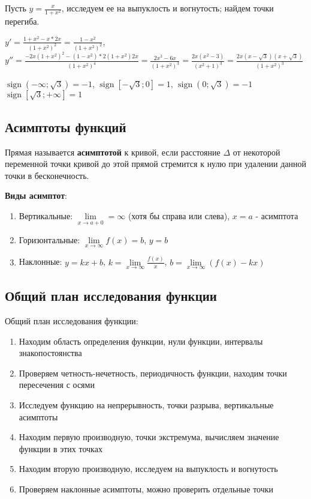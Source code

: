 \documentclass{article}
\DeclareMathOperator{\sign}{sign}
\begin{document}
\begin{flushleft}
Пусть $y = \frac{x}{1 + x^2}$, исследуем ее на выпуклость и вогнутость; найдем точки перегиба.

$y' = \frac{1 + x^2 - x * 2x}{(1 + x^2)^2} = \frac{1 - x^2}{(1 + x^2)^2}$, $y'' = \frac{-2x(1 + x^2)^2 - (1 - x^2) * 2 (1 + x^2) 2x}{(1 + x^2)^4} = \frac{2x^3 - 6x}{(1 + x^2)^3} = \frac{2x (x^2 - 3)}{(x^2 + 1)^3} = \frac{2x(x - \sqrt{3})(x + \sqrt{3})}{(1 + x^2)^3}$

$\sign (-\infty; \sqrt{3}) = -1$, $\sign [-\sqrt{3}; 0] = 1$, $\sign (0; \sqrt{3}) = -1$ $\sign [\sqrt{3}; +\infty] = 1$

\subsection{Асимптоты функций}

Прямая называется \textbf{асимптотой} к кривой, если расстояние $\Delta$ от некоторой переменной точки кривой до этой прямой стремится к нулю при удалении данной точки в бесконечность.

\textbf{Виды асимптот}:

\begin{enumerate}
    \item Вертикальные: $\lim\limits_{x \to a + 0} = \infty$ (хотя бы справа или слева), $x = a$ - асимптота
    \item Горизонтальные: $\lim\limits_{x \to \infty} f(x) = b$, $y = b$
    \item Наклонные: $y = k x + b$, $k = \lim\limits_{x \to \infty} \frac{f(x)}{x}$, $b = \lim\limits_{x \to \infty} (f(x) - k x)$
\end{enumerate}

\subsection{Общий план исследования функции}

Общий план исследования функции:

\begin{enumerate}
    \item Находим область определения функции, нули функции, интервалы знакопостоянства
    \item Проверяем четность-нечетность, периодичность функции, находим точки пересечения с осями
    \item Исследуем функцию на непрерывность, точки разрыва, вертикальные асимптоты
    \item Находим первую производную, точки экстремума, вычисляем значение функции в этих точках
    \item Находим вторую производную, исследуем на выпуклость и вогнутость
    \item Проверяем наклонные асимптоты, можно проверить отдельные точки
\end{enumerate}


\end{flushleft}
\end{document}
